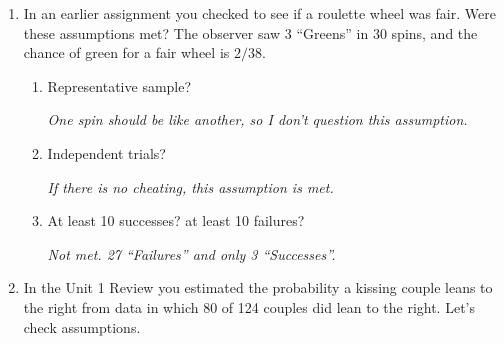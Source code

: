 \begin{enumerate}
\item In an earlier assignment  you checked to see if a roulette wheel was
     fair.  Were these assumptions met? The
     observer saw 3 ``Greens'' in 30 spins, and the  chance of
     green for a fair wheel is $2/38$. 
     \begin{enumerate}
        \item Representative sample?   
\begin{students}
        \vspace{.7cm}        
\end{students}

\begin{key}
  {\it  One spin should be like another, so I don't question this  assumption.}
\end{key}
        \item Independent trials?   
\begin{students}
        \vspace{.7cm}        
\end{students}

\begin{key}
  {\it  If there is no cheating, this assumption is met.}
\end{key}
        \item At least 10 successes? at least 10 failures?   
\begin{students}
        \vspace{.7cm}        
\end{students}

\begin{key}
  {\it  Not met. 27 ``Failures'' and only 3 ``Successes''.}
\end{key}
     \end{enumerate}


    \item In the Unit 1 Review you estimated the probability
      a kissing couple leans to the right from data in which 80 of 124
      couples did lean to the right. Let's check assumptions. 
  

\end{enumerate}
